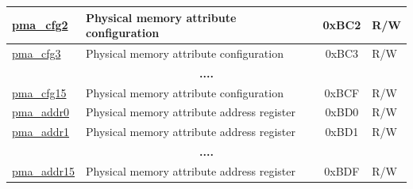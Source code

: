 \begin{longtable}{ | p{4.0cm} | p{8.4cm} | c | l | }
\hyperref[sec:riscvcpu-pma-reg-desc]{pma\_cfg2} & Physical memory attribute configuration & 0xBC2 & R/W \\\hline
\hyperref[sec:riscvcpu-pma-reg-desc]{pma\_cfg3} & Physical memory attribute configuration & 0xBC3 & R/W \\\hline
\multicolumn{4}{|c|}{\textbf{....}} \\\hline
\hyperref[sec:riscvcpu-pma-reg-desc]{pma\_cfg15} & Physical memory attribute configuration & 0xBCF & R/W \\\hline
\hyperref[sec:riscvcpu-pma-reg-desc]{pma\_addr0} & Physical memory attribute address register & 0xBD0 & R/W \\\hline
\hyperref[sec:riscvcpu-pma-reg-desc]{pma\_addr1} & Physical memory attribute address register & 0xBD1 & R/W \\\hline
\multicolumn{4}{|c|}{\textbf{....}} \\\hline
\hyperref[sec:riscvcpu-pma-reg-desc]{pma\_addr15} & Physical memory attribute address register & 0xBDF & R/W \\\hline

\end{longtable}
